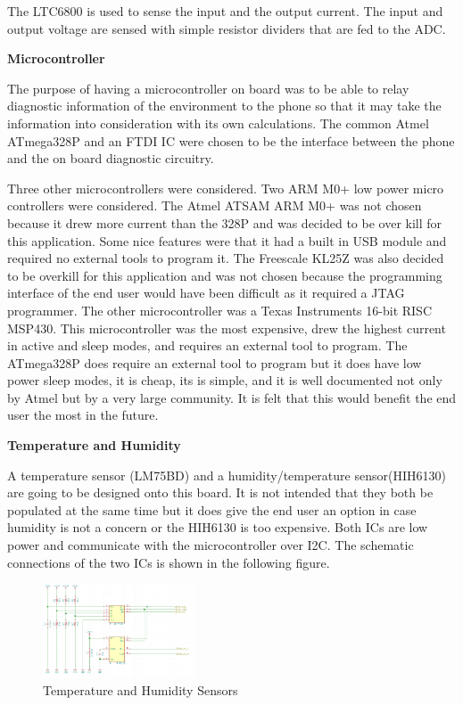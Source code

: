 \documentclass{article}
\begin{document}
{The LTC6800 is used to sense the input and the output current. The input and output voltage are sensed with simple resistor dividers that are fed to the ADC. 

\textbf{Microcontroller}


The purpose of having a microcontroller on board was to be able to relay diagnostic information of the environment to the phone so that it may take the information into consideration with its own calculations. The common Atmel ATmega328P and an FTDI IC were chosen to be the interface between the phone and the on board diagnostic circuitry. 

Three other microcontrollers were considered. Two ARM M0+ low power micro controllers were considered. The Atmel ATSAM ARM M0+ was not chosen because it drew more current than the 328P and was decided to be over kill for this application. Some nice features were that it had a built in USB module and required no external tools to program it. The Freescale KL25Z was also decided to be overkill for this application and was not chosen because the programming interface of the end user would have been difficult as it required a JTAG programmer. The other microcontroller was a Texas Instruments 16-bit RISC MSP430. This microcontroller was the most expensive, drew the highest current in active and sleep modes, and requires an external tool to program. The ATmega328P does require an external tool to program but it does have low power sleep modes, it is cheap, its is simple, and it is well documented not only by Atmel but by a very large community. It is felt that this would benefit the end user the most in the future. 

\textbf{Temperature and Humidity}

A temperature sensor (LM75BD) and a humidity/temperature sensor(HIH6130) are going to be designed onto this board. It is not intended that they both be populated at the same time but it does give the end user an option in case humidity is not a concern or the HIH6130 is too expensive. Both ICs are low power and communicate with the microcontroller over I2C. The schematic connections of the two ICs is shown in the following figure.

\begin{figure}[H]
	\centering
	\includegraphics[width=0.4\textwidth]{temphumid}
	\caption{Temperature and Humidity Sensors}
	\label{fig:tandh}
\end{figure}

}
\end{document}
